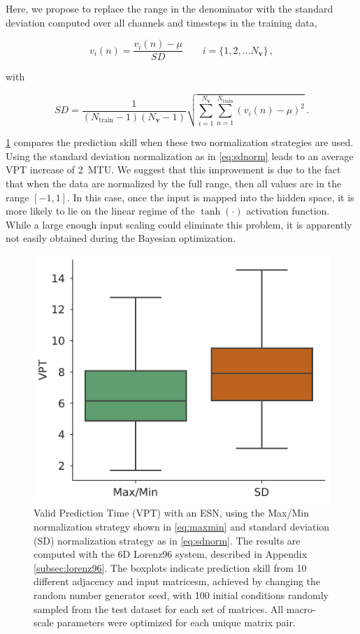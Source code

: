 \documentclass[draft]{agujournal2019}
\newcommand{\state}{\mathbf{v}}
\newcommand{\nstate}{N_{\state}}
\newcommand{\ntrain}{N_\text{train}}
\begin{document}
Here, we propose to replace the range in the denominator with the
standard deviation computed over all channels and timesteps in the training
data,
\begin{linenomath*}\begin{equation}
    v_i(n) = \dfrac{v_i(n) - \mu}{SD}
    \qquad i = \{1,2, ... \nstate\} \, ,
    \label{eq:sdnorm}
\end{equation}\end{linenomath*}
with
\begin{linenomath*}\begin{equation*}
    SD = \dfrac{1}{(\ntrain-1)(\nstate-1)}
    \sqrt{
        \sum_{i=1}^{\nstate}\sum_{n=1}^{\ntrain}\left(v_i(n) - \mu\right)^2
    }\, .
\end{equation*}\end{linenomath*}

\cref{fig:data-norm} compares the prediction skill when these two normalization
strategies are used.
Using the standard deviation normalization as in \cref{eq:sdnorm} leads to an
average VPT increase of 2~MTU.
We suggest that this improvement is due to the fact that when the data are
normalized by the full range, then all values are in the range $[-1,1]$.
In this case, once the input is mapped into the hidden space, it is more likely
to lie on the linear regime of the $\tanh(\cdot)$ activation function.
While a large enough input scaling could eliminate this problem, it is
apparently not easily obtained during the Bayesian optimization.

\begin{figure}
    \centering
    \includegraphics[width=.4\textwidth]{data-normalization.pdf}
    \caption{Valid Prediction Time (VPT) with an ESN, using the
        Max/Min normalization strategy shown in \cref{eq:maxmin} and standard
        deviation (SD)
        normalization strategy as in \cref{eq:sdnorm}.
        The results are computed with the 6D Lorenz96 system, described in
        Appendix \cref{subsec:lorenz96}.
        The boxplots indicate prediction skill from 10 different adjacency and
        input matricesm, achieved by changing the random number generator seed,
        with 100 initial conditions randomly sampled from the test dataset for
        each set of matrices.
        All macro-scale parameters were optimized for each unique matrix pair.
    }
    \label{fig:data-norm}
\end{figure}
\end{document}
